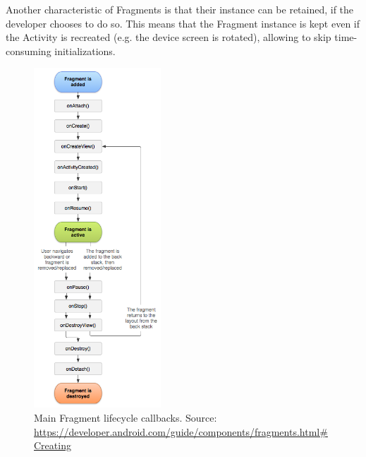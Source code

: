 \documentclass[11pt,a4paper,notitlepage]{article}
\begin{document}
Another characteristic of Fragments is that their instance can be retained, if the developer chooses to do so. This means that the Fragment instance is kept even if the Activity is recreated (e.g. the device screen is rotated), allowing to skip time-consuming initializations.
\begin{figure}
  \centering
  \includegraphics[width=180px]{Images/Android/fragment_lifecycle.png}
  \caption[Fragment Lifecycle]{Main Fragment lifecycle callbacks. Source: \url{https://developer.android.com/guide/components/fragments.html\#Creating}}
  \label{fig:fra_lifec}
\end{figure}
\end{document}
